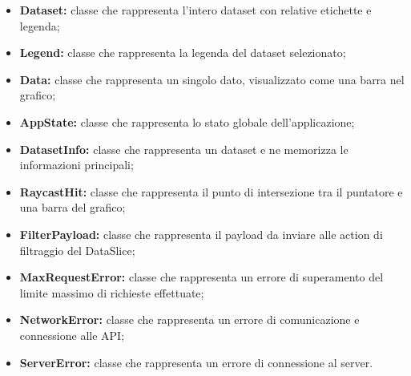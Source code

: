     \begin{itemize}
        \item \textbf{Dataset:} classe che rappresenta l'intero dataset con relative etichette e legenda;
        \item \textbf{Legend:} classe che rappresenta la legenda del dataset selezionato;
        \item \textbf{Data:} classe che rappresenta un singolo dato, visualizzato come una barra nel grafico;
        \item \textbf{AppState:} classe che rappresenta lo stato globale dell'applicazione;
        \item \textbf{DatasetInfo:} classe che rappresenta un dataset e ne memorizza le informazioni principali;
        \item \textbf{RaycastHit:} classe che rappresenta il punto di intersezione tra il puntatore e una barra del grafico;
        \item \textbf{FilterPayload:} classe che rappresenta il payload da inviare alle action di filtraggio del DataSlice;
        \item \textbf{MaxRequestError:} classe che rappresenta un errore di superamento del limite massimo di richieste effettuate;
        \item \textbf{NetworkError:} classe che rappresenta un errore di comunicazione e connessione alle API;
        \item \textbf{ServerError:} classe che rappresenta un errore di connessione al server.
    \end{itemize}
